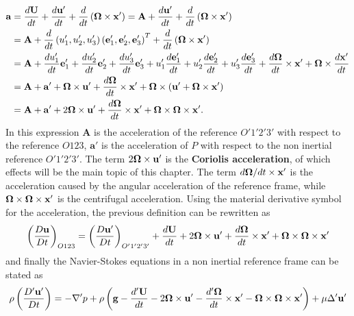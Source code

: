 \begin{align*}
\mathbf{a}&=\dfrac{d\mathbf{U}}{dt}+\dfrac{d\mathbf{u}'}{dt}+\dfrac{d}{dt}\left( \boldsymbol{\Omega}\times\mathbf{x}' \right)=\mathbf{A}+\dfrac{d\mathbf{u}'}{dt}+\dfrac{d}{dt}\left( \boldsymbol{\Omega}\times\mathbf{x}' \right)\\
&=\mathbf{A}+\dfrac{d}{dt}\left( u_{1}',u_{2}',u_{3}' \right)\left( \mathbf{e}_{1}',\mathbf{e}_{2}',\mathbf{e}_{3}' \right)^{T}+\dfrac{d}{dt}\left( \boldsymbol{\Omega}\times\mathbf{x}' \right)\\
&=\mathbf{A}+\dfrac{du_{1}'}{dt}\mathbf{e}_{1}'+\dfrac{du_{2}'}{dt}\mathbf{e}_{2}'+\dfrac{du_{3}'}{dt}\mathbf{e}_{3}'+u_{1}'\dfrac{d\mathbf{e}_{1}'}{dt}+u_{2}'\dfrac{d\mathbf{e}_{2}'}{dt}+u_{3}'\dfrac{d\mathbf{e}_{3}'}{dt}
+\dfrac{d\boldsymbol{\Omega}}{dt}\times\mathbf{x}'+\boldsymbol{\Omega}\times\dfrac{d\mathbf{x}'}{dt}\\
&=\mathbf{A}+\mathbf{a}'+\boldsymbol{\Omega}\times\mathbf{u}'+\dfrac{d\boldsymbol{\Omega}}{dt}\times\mathbf{x}'+\boldsymbol{\Omega}\times
\left( \mathbf{u}'+\boldsymbol{\Omega}\times\mathbf{x}' \right)\\
&=\mathbf{A}+\mathbf{a}'+2\boldsymbol{\Omega}\times\mathbf{u}'+\dfrac{d\boldsymbol{\Omega}}{dt}\times\mathbf{x}'+\boldsymbol{\Omega}\times\boldsymbol{\Omega}\times\mathbf{x}'.
\end{align*}
In this expression $\mathbf{A}$ is the acceleration of the reference $O'1'2'3'$ with respect to the reference $O123$, $\mathbf{a}'$ is the acceleration of $P$ with respect to the non inertial reference $O'1'2'3'$. The term $2\boldsymbol{\Omega}\times\mathbf{u}'$ is the \textbf{Coriolis acceleration}, of which effects will be the main topic of this chapter. The term $d\boldsymbol{\Omega}/dt\times\mathbf{x}'$ is the acceleration caused by the angular acceleration of the reference frame, while $\boldsymbol{\Omega}\times\boldsymbol{\Omega}\times\mathbf{x}'$ is the centrifugal acceleration. Using the material derivative symbol for the acceleration, the previous definition can be rewritten as
\begin{equation*}
\left( \dfrac{D\mathbf{u}}{Dt} \right)_{O123}=\left( \dfrac{D\mathbf{u}'}{Dt} \right)_{O'1'2'3'}+\dfrac{d\mathbf{U}}{dt}+2\boldsymbol{\Omega}\times\mathbf{u}'+\dfrac{d\boldsymbol{\Omega}}{dt}\times\mathbf{x}'+\boldsymbol{\Omega}\times\boldsymbol{\Omega}\times\mathbf{x}'
\end{equation*}
and finally the Navier-Stokes equations in a non inertial reference frame can be stated as
\begin{equation}
\rho\left( \dfrac{D'\mathbf{u}'}{Dt} \right)=-\nabla' p +\rho\left( \mathbf{g}-\dfrac{d'\mathbf{U}}{dt}-2\boldsymbol{\Omega}\times\mathbf{u}'-\dfrac{d'\boldsymbol{\Omega}}{dt}\times\mathbf{x}'-\boldsymbol{\Omega}\times\boldsymbol{\Omega}\times\mathbf{x}' \right)+\mu\Delta'\mathbf{u}'
\end{equation}
